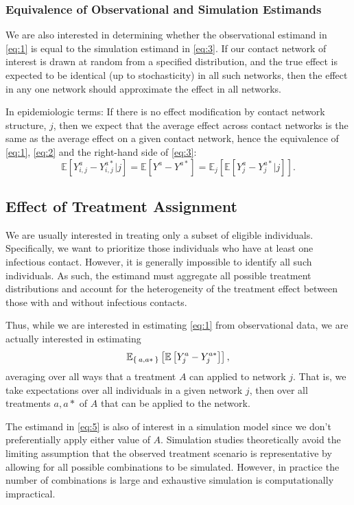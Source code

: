 \documentclass{article}
\theoremstyle{definition}
\begin{document}
\subsubsection{Equivalence of Observational and Simulation Estimands}
We are also interested in determining whether the observational estimand in \ref{eq:1} is equal to the simulation estimand in \ref{eq:3}. If our contact network of interest is drawn at random from a specified distribution, and the true effect is expected to be identical (up to stochasticity) in all such networks, then the effect in any one network should approximate the effect in all networks.

In epidemiologic terms: If there is no effect modification by contact network structure, $j$, then we expect that the average effect across contact networks is the same as the average effect on a given contact network, hence the equivalence of \ref{eq:1}, \ref{eq:2} and the right-hand side of \ref{eq:3}:
\begin{equation}\label{eq:4}
      \mathbb{E}\left[Y_{i,j}^{a}-Y_{i,j}^{a*}\vert j\right]=\mathbb{E}\left[Y^{a}-Y^{a*}\right]=\mathbb{E}_{j}\left[\mathbb{E}\left[Y_{j}^{a}-Y_{j}^{a*}\vert j\right]\right].
\end{equation}
\subsection{Effect of Treatment Assignment}
We are usually interested in treating only a subset of eligible individuals. Specifically, we want to prioritize those individuals who have at least one infectious contact. However, it is generally impossible to identify all such individuals. As such, the estimand must aggregate all possible treatment distributions and account for the heterogeneity of the treatment effect between those with and without infectious contacts.

Thus, while we are interested in estimating \ref{eq:1} from observational data, we are actually interested in estimating 
\begin{equation}\label{eq:5}
    \mathbb{E}_{\Set{a,a*   }}\left[\mathbb{E}\left[Y_{j}^{a}-Y_{j}^{a*}\right]\right],
\end{equation}
averaging over all ways that a treatment $A$ can applied to network $j$. That is, we take expectations over all individuals in a given network $j$, then over all treatments $a,a*$ of $A$ that can be applied to the network.

The estimand in \ref{eq:5} is also of interest in a simulation model since we don't preferentially apply either value of $A$. Simulation studies theoretically avoid the limiting assumption that the observed treatment scenario is representative by allowing for all possible combinations to be simulated. However, in practice the number of combinations is large and exhaustive simulation is computationally impractical.
\end{document}
